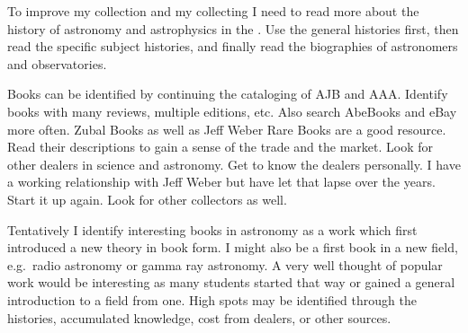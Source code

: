\documentclass[letterpaper]{article}
\begin{document}
To improve my collection and my collecting I need to read more about
the history of astronomy and astrophysics in the . Use the
general histories first, then read the specific subject histories, and
finally read the biographies of astronomers and observatories.

Books can be identified by continuing the cataloging of AJB and AAA.
Identify books with many reviews, multiple editions, etc.
Also search AbeBooks and eBay more often. Zubal Books as well as Jeff
Weber Rare Books are a good resource. Read their descriptions to gain a
sense of the trade and the market. Look for other dealers in
 science and astronomy. Get to know the dealers personally. I
have a working relationship with Jeff Weber but have let that lapse
over the years. Start it up again. Look for other collectors as well.

Tentatively I identify interesting books in  astronomy as a
work which first introduced a new theory in book form. I might also be
a first book in a new field, e.g.\ radio astronomy or gamma ray
astronomy. A very well thought of popular work would be interesting as
many students started that way or gained a general introduction to a
field from one. High spots may be identified through
the histories, accumulated knowledge, cost from dealers, or other
sources.

\printbibliography
\end{document}
